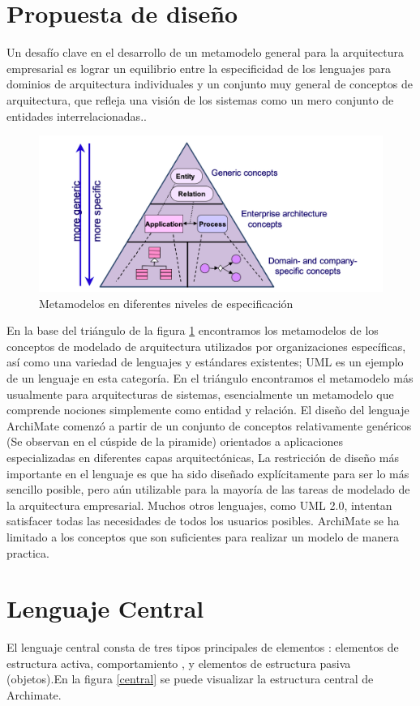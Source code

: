 \section{Propuesta de diseño}
Un desafío clave en el desarrollo de un metamodelo general para la arquitectura empresarial es lograr un equilibrio entre la especificidad de los lenguajes para dominios de arquitectura individuales y un conjunto muy general de conceptos de arquitectura, que refleja una visión de los sistemas como un mero conjunto de entidades interrelacionadas.\cite{ArchiMate2.1}.

\begin{figure}[h!]
	\centering
	\includegraphics[width=1\linewidth]{ARQUITECTURA/imgs/design}
	\caption{Metamodelos en diferentes niveles de especificación}
	\label{design}
\end{figure}
En la base del triángulo de la figura \ref{design} encontramos los metamodelos de los conceptos de modelado de arquitectura utilizados por organizaciones específicas, así como una variedad de lenguajes y estándares existentes; UML es un ejemplo de un lenguaje en esta categoría. En el triángulo encontramos el metamodelo más usualmente para arquitecturas de sistemas, esencialmente un metamodelo que comprende nociones simplemente como entidad y relación. El diseño del lenguaje ArchiMate comenzó a partir de un conjunto de conceptos relativamente genéricos (Se observan en el cúspide de la piramide) orientados a aplicaciones especializadas en diferentes capas arquitectónicas, La restricción de diseño más importante en el lenguaje es que ha sido diseñado explícitamente para ser lo más sencillo  posible, pero aún utilizable para la mayoría de las tareas de modelado  de la arquitectura empresarial. Muchos otros lenguajes, como UML 2.0, intentan satisfacer todas las necesidades de todos los usuarios posibles. ArchiMate se ha limitado a los conceptos que son suficientes para realizar un modelo de manera practica.
\newpage
\section{Lenguaje Central}
El lenguaje central consta de tres tipos principales de elementos : elementos de estructura activa, comportamiento , y elementos de estructura pasiva (objetos).En la figura \ref{central} se puede visualizar la estructura central de Archimate\cite{ArchiMate3.0}.

